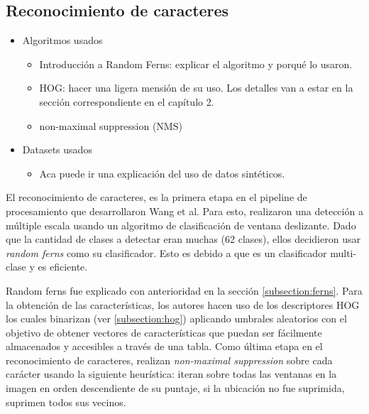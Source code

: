 \subsection{Reconocimiento de caracteres}

	\begin{itemize}
		\item Algoritmos usados
			\begin{itemize}
				\item Introducción a Random Ferns: explicar el algoritmo y porqué lo usaron.
				\item HOG: hacer una ligera mensión de su uso. Los detalles van a estar en la sección correspondiente en el capítulo 2.
				\item non-maximal suppression (NMS) 
			\end{itemize}
		\item Datasets usados 
			\begin{itemize}
				\item Aca puede ir una explicación del uso de datos sintéticos.			
			\end{itemize}			 
	\end{itemize}
	
	
	El reconocimiento de caracteres, es la primera etapa en el pipeline de procesamiento que desarrollaron Wang et al. Para esto, realizaron una detección a múltiple escala usando un algoritmo de clasificación de ventana deslizante. Dado que la cantidad de clases a detectar eran muchas (62 clases), ellos decidieron usar \textit{random ferns} como su clasificador. Esto es debido a que es un clasificador multi-clase y es eficiente.
	
	Random ferns fue explicado con anterioridad en la sección \ref{subsection:ferns}. Para la obtención de las características, los autores hacen uso de los descriptores HOG  los cuales binarizan (ver \ref{subsection:hog}) aplicando umbrales aleatorios con el objetivo de obtener vectores de características que puedan ser fácilmente almacenados y accesibles a través de una tabla. Como última etapa en el reconocimiento de caracteres, realizan \textit{non-maximal suppression} sobre cada carácter usando la siguiente heurística: iteran sobre todas las ventanas en la imagen en orden descendiente de su puntaje, si la ubicación no fue suprimida, suprimen todos sus vecinos.
	
